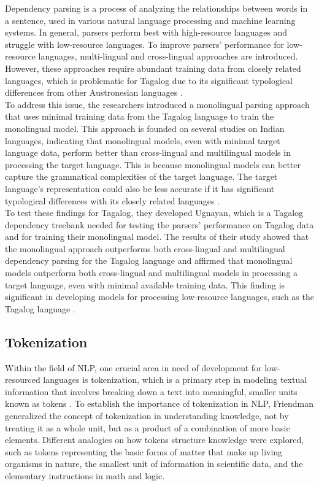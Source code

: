 \documentclass[journal]{./IEEE/IEEEtran}
\begin{document}
Dependency parsing is a process of analyzing the relationships between words in a sentence, used in various natural language processing and machine learning systems. In general, parsers perform best with high-resource languages and struggle with low-resource languages. To improve parsers' performance for low-resource languages, multi-lingual and cross-lingual approaches are introduced. However, these approaches require abundant training data from closely related languages, which is problematic for Tagalog due to its significant typological differences from other Austronesian languages {\cite{Ugnayan}}. \\

To address this issue, the researchers introduced a monolingual parsing approach that uses minimal training data from the Tagalog language to train the monolingual model. This approach is founded on several studies on Indian languages, indicating that monolingual models, even with minimal target language data, perform better than cross-lingual and multilingual models in processing the target language. This is because monolingual models can better capture the grammatical complexities of the target language. The target language's representation could also be less accurate if it has significant typological differences with its closely related languages {\cite{Ugnayan}}. \\

To test these findings for Tagalog, they developed Ugnayan, which is a Tagalog dependency treebank needed for testing the parsers' performance on Tagalog data and for training their monolingual model. The results of their study showed that the monolingual approach outperforms both cross-lingual and multilingual dependency parsing for the Tagalog language and affirmed that monolingual models outperform both cross-lingual and multilingual models in processing a target language, even with minimal available training data. This finding is significant in developing models for processing low-resource languages, such as the Tagalog language {\cite{Ugnayan}}. 

\subsection {Tokenization}

Within the field of NLP, one crucial area in need of development for low-resourced languages is tokenization, which is a primary step in modeling textual information that involves breaking down a text into meaningful, smaller units known as tokens {\cite{Cutter}}. To establish the importance of tokenization in NLP, Friendman {\cite{TokenizationInKnowledge}} generalized the concept of tokenization in understanding knowledge, not by treating it as a whole unit, but as a product of a combination of more basic elements. Different analogies on how tokens structure knowledge were explored, such as tokens representing the basic forms of matter that make up living organisms in nature, the smallest unit of information in scientific data, and the elementary instructions in math and logic. \\
\end{document}
